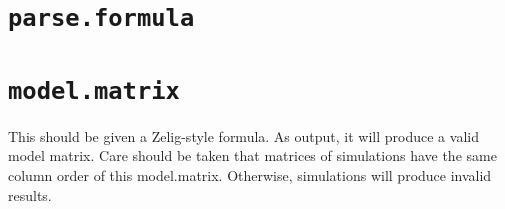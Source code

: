 \documentclass{article}
\begin{document}
\section{{\tt parse.formula}}



\section{{\tt model.matrix}}

This should be given a Zelig-style formula. As output, it will produce a valid
model matrix. Care should be taken that matrices of simulations have the same
column order of this model.matrix. Otherwise, simulations will produce invalid 
results.
\end{document}
